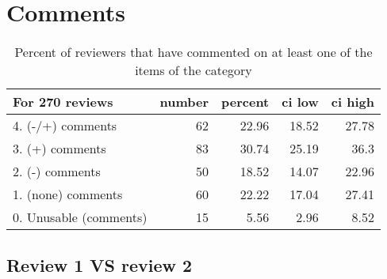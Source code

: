 \documentclass{article}
\begin{document}
\section{Comments} 

\begin{table}[H]

\centering

\begin{tabular}{lrrrr}
\hline
 For 270 reviews        &   number &   percent &   ci low &   ci high \\
\hline
 4. (-/+) comments      &       62 &     22.96 &    18.52 &     27.78 \\
 3. (+) comments        &       83 &     30.74 &    25.19 &     36.3  \\
 2. (-) comments        &       50 &     18.52 &    14.07 &     22.96 \\
 1. (none) comments     &       60 &     22.22 &    17.04 &     27.41 \\
 0. Unusable (comments) &       15 &      5.56 &     2.96 &      8.52 \\
\hline
\end{tabular}\caption{Percent of reviewers that have commented on at least one of the items of the category}

\end{table}



\subsection{Review 1 VS review 2} 
\end{document}
